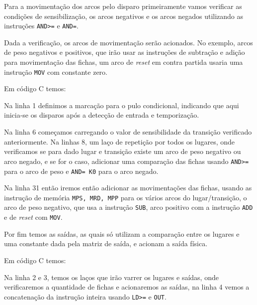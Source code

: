 Para a movimentação dos arcos pelo disparo primeiramente vamos verificar as condições de sensibilização, os arcos negativos e os arcos negados utilizando as instruções \lstinline{AND>=} e \lstinline{AND=}.



Dada a verificação, os arcos de movimentação serão acionados. No exemplo, arcos de peso negativos e positivos, que irão usar as instruções de subtração e adição para movimentação das fichas, um arco de \textit{reset} em contra partida usaria uma instrução \lstinline{MOV} com constante zero.

Em código C temos:



Na linha 1 definimos a marcação para o pulo condicional, indicando que aqui inicia-se os disparos após a detecção de entrada e temporização. 

Na linha 6 começamos carregando o valor de sensibilidade da transição verificado anteriormente. Na linhas 8, um laço de repetição por todos os lugares, onde verificamos se para dado lugar e transição existe um arco de peso negativo ou arco negado, e se for o caso, adicionar uma comparação das fichas usando \lstinline{AND>=} para o arco de peso e \lstinline{AND= K0} para o arco negado.

Na linha 31 então iremos então adicionar as movimentações das fichas, usando as instrução de memória \lstinline{MPS, MRD, MPP} para os vários arcos do lugar/transição, o arco de peso negativo, que usa a instrução \lstinline{SUB}, arco positivo com a instrução \lstinline{ADD} e de \textit{reset} com \lstinline{MOV}. 

Por fim temos as saídas, as quais só utilizam a comparação entre os lugares e uma constante dada pela matriz de saída, e acionam a saída física.



Em código C temos:



Na linha 2 e 3, temos os laços que irão varrer os lugares e saídas, onde verificaremos a quantidade de fichas e acionaremos as saídas, na linha 4 vemos a concatenação da instrução inteira usando \lstinline{LD>=} e \lstinline{OUT}. 